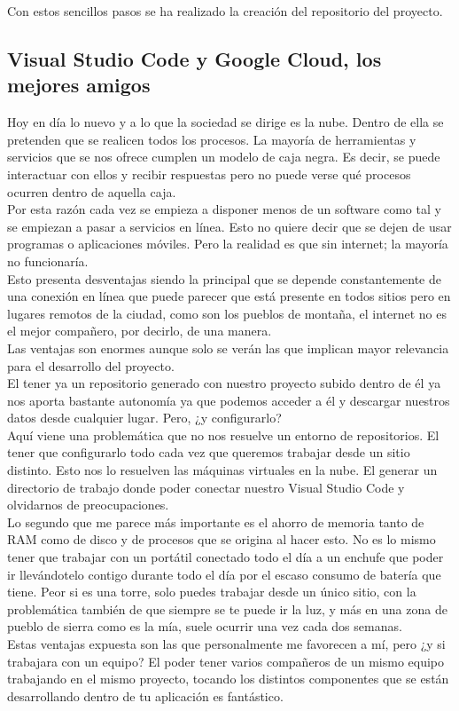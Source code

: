 Con estos sencillos pasos se ha realizado la creación del repositorio del proyecto.

\subsection{Visual Studio Code y Google Cloud, los mejores amigos}
Hoy en día lo nuevo y a lo que la sociedad se dirige es la nube. Dentro de ella se pretenden que se realicen todos los procesos. La mayoría de herramientas y servicios que se nos ofrece cumplen un modelo de caja negra. Es decir, se puede interactuar con ellos y recibir respuestas pero no puede verse qué procesos ocurren dentro de aquella caja.
\\Por esta razón cada vez se empieza a disponer menos de un software como tal y se empiezan a pasar a servicios en línea. Esto no quiere decir que se dejen de usar programas o aplicaciones móviles. Pero la realidad es que sin internet; la mayoría no funcionaría.
\\Esto presenta desventajas siendo la principal que se depende constantemente de una conexión en línea que puede parecer que está presente en todos sitios pero en lugares remotos de la ciudad, como son los pueblos de montaña, el internet no es el mejor compañero, por decirlo, de una manera.
\\Las ventajas son enormes aunque solo se verán las que implican mayor relevancia para el desarrollo del proyecto.
\\El tener ya un repositorio generado con nuestro proyecto subido dentro de él ya nos aporta bastante autonomía ya que podemos acceder a él y descargar nuestros datos desde cualquier lugar. Pero, ¿y configurarlo?
\\Aquí viene una problemática que no nos resuelve un entorno de repositorios. El tener que configurarlo todo cada vez que queremos trabajar desde un sitio distinto. Esto nos lo resuelven las máquinas virtuales en la nube. El generar un directorio de trabajo donde poder conectar nuestro Visual Studio Code y olvidarnos de preocupaciones.
\\Lo segundo que me parece más importante es el ahorro de memoria tanto de RAM como de disco y de procesos que se origina al hacer esto. No es lo mismo tener que trabajar con un portátil conectado todo el día a un enchufe que poder ir llevándotelo contigo durante todo el día por el escaso consumo de batería que tiene. Peor si es una torre, solo puedes trabajar desde un único sitio, con la problemática también de que siempre se te puede ir la luz, y más en una zona de pueblo de sierra como es la mía, suele ocurrir una vez cada dos semanas.
\\Estas ventajas expuesta son las que personalmente me favorecen a mí, pero ¿y si trabajara con un equipo? El poder tener varios compañeros de un mismo equipo trabajando en el mismo proyecto, tocando los distintos componentes que se están desarrollando dentro de tu aplicación es fantástico.

